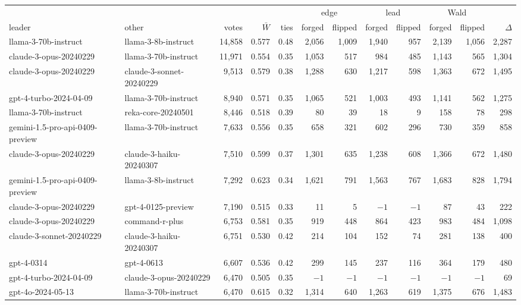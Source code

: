 \begin{tabular}{llrrrrrrrrrr}
\toprule
 & & & & & \multicolumn{2}{c}{edge} & \multicolumn{2}{c}{lead} & \multicolumn{2}{c}{Wald} & \\
\cmidrule(lr){6-7}\cmidrule(lr){8-9}\cmidrule(lr){10-11}
leader & other & votes & $\bar W$ & ties & forged & flipped & forged & flipped & forged & flipped & $\Delta$ \\
\midrule
llama-3-70b-instruct & llama-3-8b-instruct & 14,858 & 0.577 & 0.48 & 2,056 & 1,009 & 1,940 & 957 & 2,139 & 1,056 & 2,287 \\
claude-3-opus-20240229 & llama-3-70b-instruct & 11,971 & 0.554 & 0.35 & 1,053 & 517 & 984 & 485 & 1,143 & 565 & 1,304 \\
claude-3-opus-20240229 & claude-3-sonnet-20240229 & 9,513 & 0.579 & 0.38 & 1,288 & 630 & 1,217 & 598 & 1,363 & 672 & 1,495 \\
gpt-4-turbo-2024-04-09 & llama-3-70b-instruct & 8,940 & 0.571 & 0.35 & 1,065 & 521 & 1,003 & 493 & 1,141 & 562 & 1,275 \\
llama-3-70b-instruct & reka-core-20240501 & 8,446 & 0.518 & 0.39 & 80 & 39 & 18 & 9 & 158 & 78 & 298 \\
gemini-1.5-pro-api-0409-preview & llama-3-70b-instruct & 7,633 & 0.556 & 0.35 & 658 & 321 & 602 & 296 & 730 & 359 & 858 \\
claude-3-opus-20240229 & claude-3-haiku-20240307 & 7,510 & 0.599 & 0.37 & 1,301 & 635 & 1,238 & 608 & 1,366 & 672 & 1,480 \\
gemini-1.5-pro-api-0409-preview & llama-3-8b-instruct & 7,292 & 0.623 & 0.34 & 1,621 & 791 & 1,563 & 767 & 1,683 & 828 & 1,794 \\
claude-3-opus-20240229 & gpt-4-0125-preview & 7,190 & 0.515 & 0.33 & 11 & 5 & $-1$ & $-1$ & 87 & 43 & 222 \\
claude-3-opus-20240229 & command-r-plus & 6,753 & 0.581 & 0.35 & 919 & 448 & 864 & 423 & 983 & 484 & 1,098 \\
claude-3-sonnet-20240229 & claude-3-haiku-20240307 & 6,751 & 0.530 & 0.42 & 214 & 104 & 152 & 74 & 281 & 138 & 400 \\
gpt-4-0314 & gpt-4-0613 & 6,607 & 0.536 & 0.42 & 299 & 145 & 237 & 116 & 364 & 179 & 480 \\
gpt-4-turbo-2024-04-09 & claude-3-opus-20240229 & 6,470 & 0.505 & 0.35 & $-1$ & $-1$ & $-1$ & $-1$ & $-1$ & $-1$ & 69 \\
gpt-4o-2024-05-13 & llama-3-70b-instruct & 6,470 & 0.615 & 0.32 & 1,314 & 640 & 1,263 & 619 & 1,375 & 676 & 1,483 \\

\end{tabular}
